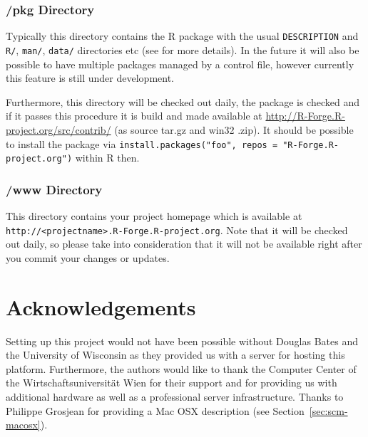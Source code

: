 \documentclass[a4paper]{article}
\begin{document}
\subsubsection{/pkg Directory}
Typically this directory contains the R package with the usual
\texttt{DESCRIPTION} and \texttt{R/}, \texttt{man/}, \texttt{data/}
directories etc (see \cite{Rcore:writing_R_extensions}
for more details).
In the future it will also be possible to have multiple
packages managed by a control file, however currently this feature is still
under development.

Furthermore, this directory will be checked out daily, the package is
checked and if it passes this procedure it is build and made available
at\newline 
\url{http://R-Forge.R-project.org/src/contrib/} (as source tar.gz and win32
.zip). It should be possible to install the package via
\texttt{install.packages("foo", repos = "R-Forge.R-project.org")} within R
then.

\subsubsection{/www Directory}
This directory contains your project homepage which is available at
\texttt{http://<projectname>.R-Forge.R-project.org}.
Note that it will be checked out daily, so please take
into consideration that it will not be available right after you
commit your changes or updates. 


\section{Acknowledgements}

Setting up this project would not have been possible without Douglas
Bates and the University of Wisconsin as they provided us with a
server for hosting this platform. Furthermore, 
the authors would like to thank the Computer Center 
of the Wirtschaftsuniversit\"at Wien for
their support and for providing us with additional hardware as well as a
professional server infrastructure. 
Thanks to Philippe Grosjean for
providing a Mac OSX description (see Section~\ref{sec:scm-macosx}).




\end{document}
